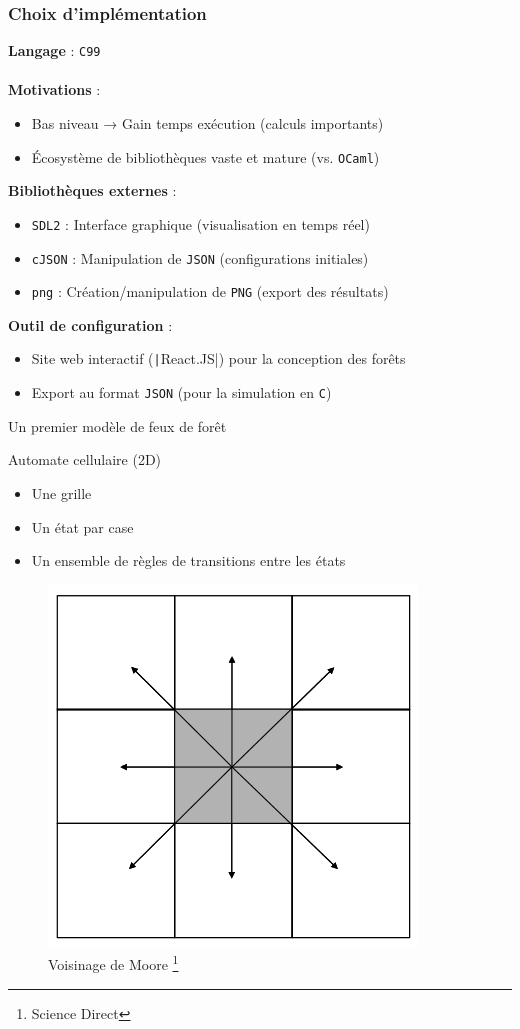 \documentclass{beamer}
\begin{document}
\begin{frame}
    \frametitle{Choix d'implémentation \hyperlink{jump}{\beamerbutton{ }} \hypertarget{3}{\beamerbutton{ }}}
   
\textbf{Langage} : \texttt{C99} \\ \\
\textbf{Motivations} :
\begin{itemize}
    \item Bas niveau → Gain temps exécution (calculs importants)
    \item Écosystème de bibliothèques vaste et mature (vs. \texttt{OCaml})
\end{itemize}

\textbf{Bibliothèques externes} :
\begin{itemize}
    \item \texttt{SDL2} : Interface graphique (visualisation en temps réel)
    \item \texttt{cJSON} : Manipulation de \texttt{JSON} (configurations initiales)
    \item \texttt{png} : Création/manipulation de \texttt{PNG} (export des résultats)
\end{itemize}

\textbf{Outil de configuration} :
\begin{itemize}
    \item Site web interactif (\texttt|React.JS|) pour la conception des forêts
    \item Export au format \texttt{JSON} (pour la simulation en \texttt{C})
\end{itemize}
\end{frame}

\begin{frame}{Un premier modèle de feux de forêt \hyperlink{jump}{\beamerbutton{ }} \hypertarget{4}{\beamerbutton{ }}}
    \begin{block}{Automate cellulaire (2D)}
        \begin{itemize}
            \item Une grille
            \item Un état par case
            \item Un ensemble de règles de transitions entre les états
        \end{itemize}
    \end{block}

    \begin{figure}
        \centering
        \includegraphics[width=0.25\linewidth]{pictures/moore.png}
        \caption{Voisinage de Moore {\footnote{Science Direct}}}
        \label{fig:enter-label}
    \end{figure}
\end{frame}
\end{document}
